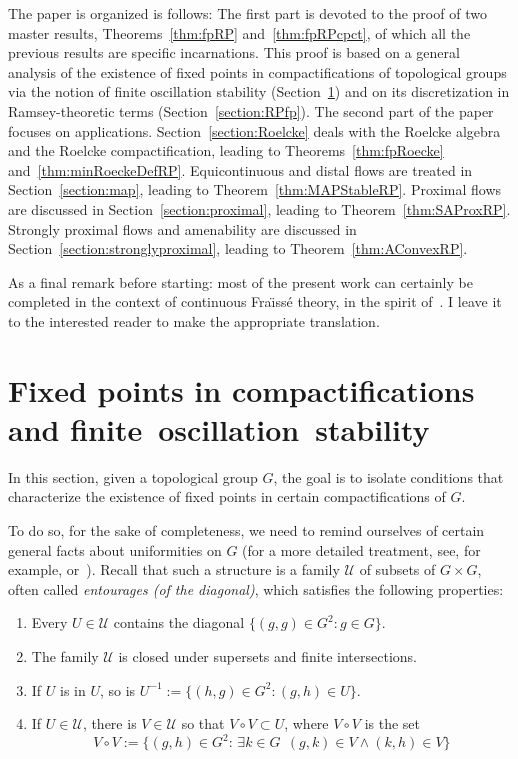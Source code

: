 \documentclass[11pt]{article}
\theoremstyle{definition}
\numberwithin{equation}{section}
\numberwithin{figure}{section}
\numberwithin{table}{section}
\let\oldexists\exists
\renewcommand*{\exists}{\mathrel{\oldexists}}
\begin{document}
The paper is organized is follows: The first part is devoted to the proof of two master results, Theorems~\ref{thm:fpRP} and~\ref{thm:fpRPcpct}, of which all the previous results are specific incarnations. This proof is based on a general analysis of the existence of fixed points in compactifications of topological groups via the notion of finite oscillation stability (Section~\ref{section:oscillationstability}) and on its discretization in Ramsey-theoretic terms (Section~\ref{section:RPfp}). The second part of the paper focuses on applications. Section~\ref{section:Roelcke} deals with the Roelcke algebra and the Roelcke compactification, leading to Theorems~\ref{thm:fpRoecke} and~\ref{thm:minRoeckeDefRP}. Equicontinuous and distal flows are treated in Section~\ref{section:map}, leading to Theorem~\ref{thm:MAPStableRP}. Proximal flows are discussed in Section~\ref{section:proximal}, leading to Theorem~\ref{thm:SAProxRP}. Strongly proximal flows and amenability are discussed in Section~\ref{section:stronglyproximal}, leading to Theorem~\ref{thm:AConvexRP}.

As a final remark before starting: most of the present work can certainly be completed in the context of continuous Fra\"{\i}ss\'e theory, in the spirit of~\cite{MT}. I leave it to the interested reader to make the appropriate translation.


\section{Fixed points in compactifications and finite~oscillation~stability}
\label{section:oscillationstability}

In this section, given a topological group $G$, the goal is to isolate conditions that characterize the existence of fixed points in certain compactifications of $G$.

To do so, for the sake of completeness, we need to remind ourselves of certain general facts about uniformities on $G$ (for a more detailed treatment, see, for example, \cite{Bou} or~\cite{Eng}). Recall that such a structure is a family $\mathcal U$ of subsets of $G\times G$, often called \emph{entourages (of the diagonal)}, which satisfies the following properties:
\begin{enumerate}
\item Every $U\in \mathcal U$ contains the diagonal $\{ (g,g) \in G^{2}: g\in G \}$.
\item The family $\mathcal U$ is closed under supersets and finite intersections.
\item If $U$ is in $U$, so is $U^{-1}:=\{ (h,g) \in G^{2}: (g,h)\in U \}$.
\item If $U\in \mathcal U$, there is $V\in \mathcal U$ so that $V\circ V \subset U$, where $V\circ V$ is the set
\[
V\circ V:=\{ (g,h) \in G^{2}:\, \exists k \in G \ \ (g,k)\in V \wedge (k,h)\in V\}
\]
\end{enumerate}
\end{document}

